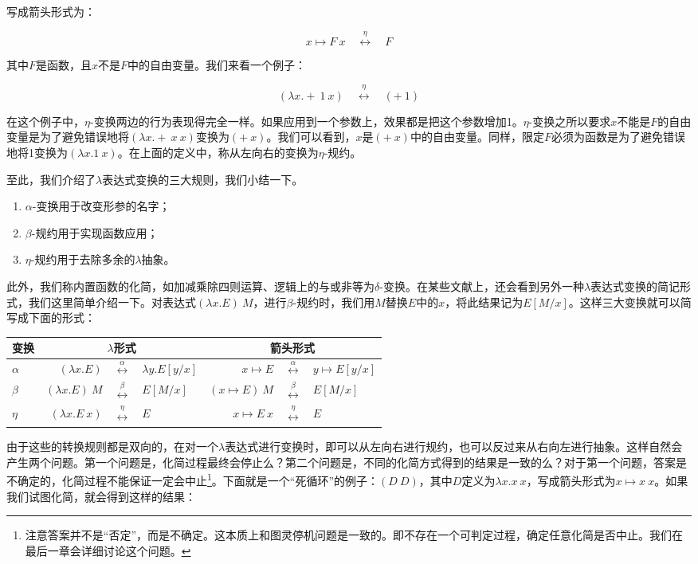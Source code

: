 \documentclass[UTF8]{article}
\begin{document}
写成箭头形式为：

\[
x \mapsto F\ x \quad \overset{\eta}{\longleftrightarrow} \quad F
\]

其中$F$是函数，且$x$不是$F$中的自由变量。我们来看一个例子：

\[
(\lambda x . +\ 1\ x) \quad \overset{\eta}{\longleftrightarrow} \quad (+\ 1)
\]

在这个例子中，$\eta$-变换两边的行为表现得完全一样。如果应用到一个参数上，效果都是把这个参数增加1。$\eta$-变换之所以要求$x$不能是$F$的自由变量是为了避免错误地将$(\lambda x. +\ x\ x)$变换为$(+\ x)$。我们可以看到，$x$是$(+\ x)$中的自由变量。同样，限定$F$必须为函数是为了避免错误地将1变换为$(\lambda x . 1\ x)$。在上面的定义中，称从左向右的变换为$\eta$-规约。

至此，我们介绍了$\lambda$表达式变换的三大规则，我们小结一下。

\begin{enumerate}
\item $\alpha$-变换用于改变形参的名字；
\item $\beta$-规约用于实现函数应用；
\item $\eta$-规约用于去除多余的$\lambda$抽象。
\end{enumerate}

此外，我们称内置函数的化简，如加减乘除四则运算、逻辑上的与或非等为$\delta$-变换。在某些文献上，还会看到另外一种$\lambda$表达式变换的简记形式，我们这里简单介绍一下。对表达式$(\lambda x. E)\ M$，进行$\beta$-规约时，我们用$M$替换$E$中的$x$，将此结果记为$E[M/x]$。这样三大变换就可以简写成下面的形式：

\begin{tabular}{|l|rcl|rcl|}
\hline
变换 & \multicolumn{3}{|c|}{$\lambda$形式} & \multicolumn{3}{|c|}{箭头形式} \\
\hline
$\alpha$ & $(\lambda x . E)$ & $\overset{\alpha}{\longleftrightarrow}$ & $\lambda y . E[y/x]$
         & $x \mapsto E$ & $\overset{\alpha}{\longleftrightarrow}$ & $y \mapsto E[y/x]$ \\
\hline
$\beta$  & $(\lambda x . E)\ M$ & $\overset{\beta}{\longleftrightarrow}$ & $E[M/x]$
         & $(x \mapsto E)\ M$ & $\overset{\beta}{\longleftrightarrow}$ & $E[M/x]$ \\
\hline
$\eta$   & $(\lambda x . E\ x)$ & $\overset{\eta}{\longleftrightarrow}$ & $E$
         & $x \mapsto E\ x$ & $\overset{\eta}{\longleftrightarrow}$ & $E$ \\
\hline
\end{tabular}

由于这些的转换规则都是双向的，在对一个$\lambda$表达式进行变换时，即可以从左向右进行规约，也可以反过来从右向左进行抽象。这样自然会产生两个问题。第一个问题是，化简过程最终会停止么？第二个问题是，不同的化简方式得到的结果是一致的么？对于第一个问题，答案是不确定的，化简过程不能保证一定会中止\footnote{注意答案并不是“否定”，而是不确定。这本质上和图灵停机问题是一致的。即不存在一个可判定过程，确定任意化简是否中止。我们在最后一章会详细讨论这个问题。}。下面就是一个“死循环”的例子：$(D\ D)$，其中$D$定义为$\lambda x. x\ x$，写成箭头形式为$x \mapsto x\ x$。如果我们试图化简，就会得到这样的结果：
\end{document}
